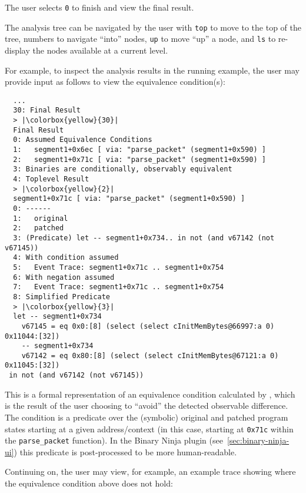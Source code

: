 The user selects \texttt{0} to finish and view the final result.

The \pate{} analysis tree can be navigated by the user with \texttt{top} to move to the top of the tree, numbers to navigate ``into'' nodes, \texttt{up} to move ``up'' a node, and \texttt{ls} to re-display the nodes available at a current level.

For example, to inspect the analysis results in the running example, the user may provide input as follows to view the equivalence condition(s):

\begin{lstlisting}
  ...
  30: Final Result
  > |\colorbox{yellow}{30}|
  Final Result
  0: Assumed Equivalence Conditions
  1:   segment1+0x6ec [ via: "parse_packet" (segment1+0x590) ]
  2:   segment1+0x71c [ via: "parse_packet" (segment1+0x590) ]
  3: Binaries are conditionally, observably equivalent
  4: Toplevel Result
  > |\colorbox{yellow}{2}|
  segment1+0x71c [ via: "parse_packet" (segment1+0x590) ]
  0: ------
  1:   original
  2:   patched
  3: (Predicate) let -- segment1+0x734.. in not (and v67142 (not v67145))
  4: With condition assumed
  5:   Event Trace: segment1+0x71c .. segment1+0x754
  6: With negation assumed
  7:   Event Trace: segment1+0x71c .. segment1+0x754
  8: Simplified Predicate
  > |\colorbox{yellow}{3}|
  let -- segment1+0x734
    v67145 = eq 0x0:[8] (select (select cInitMemBytes@66997:a 0) 0x11044:[32])
    -- segment1+0x734
    v67142 = eq 0x80:[8] (select (select cInitMemBytes@67121:a 0) 0x11045:[32])
 in not (and v67142 (not v67145))
\end{lstlisting}

This is a formal representation of an equivalence condition calculated by \pate{}, which is the result of the user
choosing to ``avoid'' the detected observable difference. The condition is a predicate over the (symbolic) original and patched program
states starting at a given address/context (in this case, starting at \texttt{0x71c} within the \texttt{parse\_packet} function).
In the Binary Ninja plugin (see~\ref{sec:binary-ninja-ui}) this predicate is post-processed to be more human-readable.

Continuing on, the user may view, for example, an example trace showing where the equivalence condition above does not hold:

